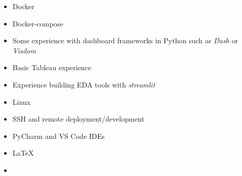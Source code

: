 
\begin{itemize}
\item Docker
\item Docker-compose

\end{itemize}

\begin{itemize}
\item Some experience with dashboard frameworks in Python such as \textit{Dash} or \textit{Visdom}
\item Basic Tableau experience
\item Experience building EDA tools with \textit{streamlit}

\end{itemize}

\begin{itemize}
\item Linux {\faLinux}
\item SSH and remote deployment/development
\item PyCharm and VS Code IDEs
\item \LaTeX
\item  {\faGit}
\end{itemize}
